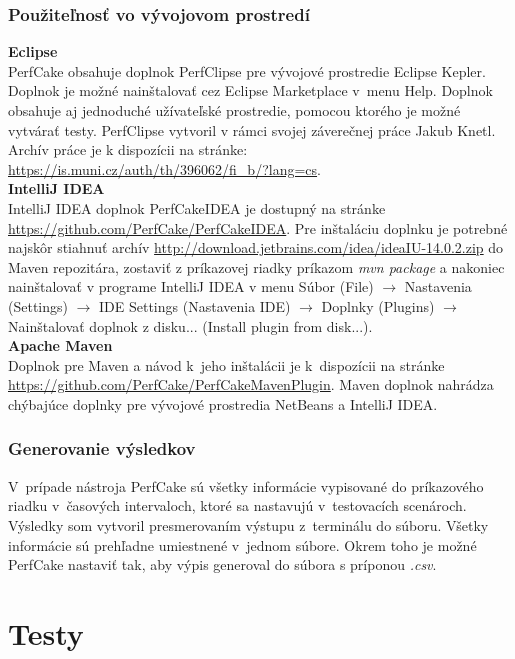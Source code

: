 \documentclass[12pt,oneside,final]{fithesis-utf8}
\begin{document}
\subsection{Použiteľnosť vo vývojovom prostredí}
\textbf{Eclipse}\\
PerfCake obsahuje doplnok PerfClipse pre vývojové prostredie Eclipse Kepler. Doplnok je možné nainštalovať cez Eclipse Marketplace v~menu Help. Doplnok obsahuje aj jednoduché užívateľské prostredie, pomocou ktorého je možné vytvárať testy. PerfClipse vytvoril v rámci svojej záverečnej práce Jakub Knetl. Archív práce je k dispozícii na stránke: \url{https://is.muni.cz/auth/th/396062/fi_b/?lang=cs}.\\

\noindent\textbf{IntelliJ IDEA}\\
IntelliJ IDEA doplnok PerfCakeIDEA je dostupný na stránke \url{https://github.com/PerfCake/PerfCakeIDEA}. Pre inštaláciu doplnku je potrebné najskôr stiahnuť archív \url{http://download.jetbrains.com/idea/ideaIU-14.0.2.zip} do Maven repozitára, zostaviť z príkazovej riadky príkazom \textit{mvn package} a nakoniec nainštalovať v programe IntelliJ IDEA v menu Súbor (File) $\rightarrow$ Nastavenia (Settings) $\rightarrow$ IDE Settings (Nastavenia IDE) $\rightarrow$ Doplnky (Plugins) $\rightarrow$ Nainštalovať doplnok z disku... (Install plugin from disk...)\cite{Michalko}.\\

\noindent\textbf{Apache Maven}\\
Doplnok pre Maven a návod k~jeho inštalácii je k~dispozícii na stránke \url{https://github.com/PerfCake/PerfCakeMavenPlugin}. Maven doplnok nahrádza chýbajúce doplnky pre vývojové prostredia NetBeans a IntelliJ IDEA.

\subsection{Generovanie výsledkov}
V~prípade nástroja PerfCake sú všetky informácie vypisované do príkazového riadku v~časových intervaloch, ktoré sa nastavujú v~testovacích scenároch. Výsledky som vytvoril presmerovaním výstupu z~terminálu do súboru. Všetky informácie sú prehľadne umiestnené v~jednom súbore. Okrem toho je možné PerfCake nastaviť tak, aby výpis generoval do súbora s príponou \textit{.csv}.

\chapter{Testy}
\end{document}
